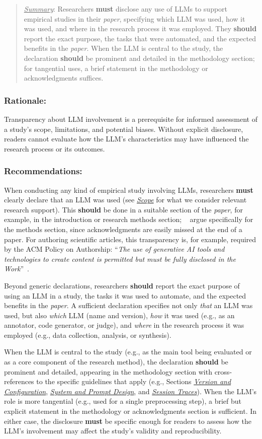 \documentclass[smallextended]{svjour3}
\newcommand*{\enq}[1]{\enquote{{\itshape#1}}}
\newcommand{\must}{\textbf{must}\xspace}
\newcommand{\should}{\textbf{should}\xspace}
\newcommand{\summary}{\underline{\emph{Summary}}\xspace}
\newcommand{\summary}{\textbf{\emph{Summary}}\xspace}
\newcommand{\paper}{\emph{paper}\xspace}
\newcommand{\paper}{\emph{paper}\xspace}
\newenvironment{framed}{\begin{quote}}{\end{quote}}
\newcommand{\scope}{\hyperref[sec:scope]{\emph{Scope}}\xspace}
\newcommand{\scope}{\href{/scope/}{\emph{Scope}}\xspace}
\newcommand{\modelversion}{\hyperref[sec:report-model-version-configuration-and-customizations]{\emph{Version and Configuration}}\xspace}
\newcommand{\design}{\hyperref[sec:report-system-and-prompt-design]{\emph{System and Prompt Design}}\xspace}
\newcommand{\traces}{\hyperref[sec:report-session-traces]{\emph{Session Traces}}\xspace}
\newcommand{\modelversion}{\href{/guidelines\#report-model-version-configuration-and-customizations}{\emph{Version and Configuration}}\xspace}
\newcommand{\design}{\href{/guidelines\#report-system-and-prompt-design}{\emph{System and Prompt Design}}\xspace}
\newcommand{\traces}{\href{/guidelines\#report-session-traces}{\emph{Session Traces}}\xspace}
\newcommand{\guidelinesubsubsection}[1]{\subsubsection{\bfseries #1:}}
\newcommand{\guidelinesubsubsection}[1]{\subsubsection{#1}}
\begin{document}
\vspace{0.5\baselineskip}
\begin{framed}
\summary: Researchers \must disclose any use of LLMs to support empirical studies in their \paper, specifying which LLM was used, how it was used, and where in the research process it was employed. They \should report the exact purpose, the tasks that were automated, and the expected benefits in the \paper. When the LLM is central to the study, the declaration \should be prominent and detailed in the methodology section; for tangential uses, a brief statement in the methodology or acknowledgments suffices. \end{framed}

\guidelinesubsubsection{Rationale}

Transparency about LLM involvement is a prerequisite for informed assessment of a study's scope, limitations, and potential biases.
Without explicit disclosure, readers cannot evaluate how the LLM's characteristics may have influenced the research process or its outcomes.

\guidelinesubsubsection{Recommendations}

When conducting any kind of empirical study involving LLMs, researchers \must clearly declare that an LLM was used (see \scope for what we consider relevant research support).
This \should be done in a suitable section of the \paper, for example, in the introduction or research methods section; \citeauthor{cheng2025writing}~\cite{cheng2025writing} argue specifically for the methods section, since acknowledgments are easily missed at the end of a paper.
For authoring scientific articles, this transparency is, for example, required by the ACM Policy on Authorship: \enq{The use of generative AI tools and technologies to create content is permitted but must be fully disclosed in the Work}~\cite{ACM2023}.

Beyond generic declarations, researchers \should report the exact purpose of using an LLM in a study, the tasks it was used to automate, and the expected benefits in the \paper.
A sufficient declaration specifies not only \emph{that} an LLM was used, but also \emph{which} LLM (name and version), \emph{how} it was used (e.g., as an annotator, code generator, or judge), and \emph{where} in the research process it was employed (e.g., data collection, analysis, or synthesis).

When the LLM is central to the study (e.g., as the main tool being evaluated or as a core component of the research method), the declaration \should be prominent and detailed, appearing in the methodology section with cross-references to the specific guidelines that apply (e.g., Sections \modelversion, \design, and \traces).
When the LLM's role is more tangential (e.g., used for a single preprocessing step), a brief but explicit statement in the methodology or acknowledgments section is sufficient.
In either case, the disclosure \must be specific enough for readers to assess how the LLM's involvement may affect the study's validity and reproducibility.
\end{document}
